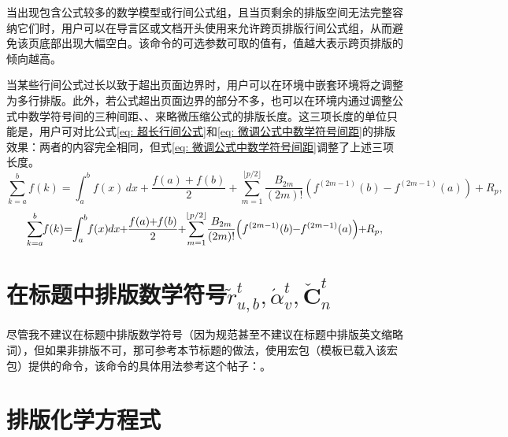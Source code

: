 \documentclass[doctor, vlined, ]{DissertUESTC}
\begin{document}
	当出现包含公式较多的数学模型或行间公式组，且当页剩余的排版空间无法完整容纳它们时，用户可以在导言区或文档开头使用来允许跨页排版行间公式组，从而避免该页底部出现大幅空白。该命令的可选参数可取的值有，值越大表示跨页排版的倾向越高。

	当某些行间公式过长以致于超出页面边界时，用户可以在环境中嵌套环境将之调整为多行排版。此外，若公式超出页面边界的部分不多，也可以在环境内通过调整公式中数学符号间的三种间距、、来略微压缩公式的排版长度。这三项长度的单位只能是，用户可对比公式\eqref{eq: 超长行间公式}和\eqref{eq: 微调公式中数学符号间距}的排版效果：两者的内容完全相同，但式\eqref{eq: 微调公式中数学符号间距}调整了上述三项长度。
	\begin{equation} \label{eq: 超长行间公式}
		\sum_{k=a}^{b} f(k) = \int_{a}^{b} f(x) \, dx + \frac{f(a) + f(b)}{2} + \sum_{m=1}^{\lfloor p/2 \rfloor} \frac{B_{2m}}{(2m)!} \left( f^{(2m-1)}(b) - f^{(2m-1)}(a) \right) + R_p,
	\end{equation}
	\begin{equation} \label{eq: 微调公式中数学符号间距}
		\thinmuskip=-1mu \medmuskip=-1mu \thickmuskip=0mu
		\sum_{k=a}^{b} f(k) = \int_{a}^{b} f(x) \, dx + \frac{f(a) + f(b)}{2} + \sum_{m=1}^{\lfloor p/2 \rfloor} \frac{B_{2m}}{(2m)!} \left( f^{(2m-1)}(b) - f^{(2m-1)}(a) \right) + R_p,
	\end{equation}


	\section{在标题中排版数学符号\texorpdfstring{$\tilde{r}^t_{u,b}, \acute{\alpha}^t_v, \check{\boldsymbol{C}}^t_n$}{示例}}

	尽管我不建议在标题中排版数学符号（因为规范甚至不建议在标题中排版英文缩略词），但如果非排版不可，那可参考本节标题的做法，使用\href{https://mirrors.tuna.tsinghua.edu.cn/CTAN/macros/latex/contrib/hyperref/doc/hyperref-doc.pdf}{\ttfamily\color{DarkRed}}宏包（模板已载入该宏包）提供的命令，该命令的具体用法参考这个帖子：\href{https://blog.csdn.net/qq_42679415/article/details/139592054}{\ttfamily\color{DarkRed}}。

	
	\section{排版化学方程式}
\end{document}
